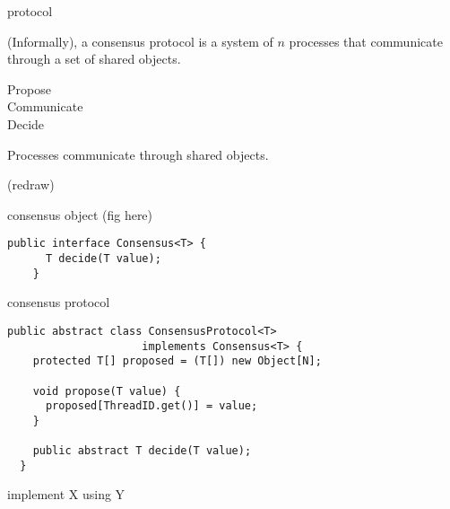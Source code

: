 \begin{frame}{}
  protocol
\end{frame}

\begin{frame}{}
  \begin{definition}
    (Informally), a consensus protocol is a system of $n$ processes
    that communicate through a set of shared objects.

    \begin{description}
      \item[Propose]
      \item[Communicate] 
      \item[Decide] 
    \end{description}
  \end{definition}
\end{frame}

\begin{frame}{}
  \centerline{Processes communicate through shared objects.}

  (redraw)
\end{frame}

\begin{frame}[fragile]{}
  consensus object (fig here)

  \begin{lstlisting}[style = JavaStyle]
    public interface Consensus<T> {
      T decide(T value);
    }
  \end{lstlisting}
\end{frame}

\begin{frame}[fragile]{}
  consensus protocol

  \begin{lstlisting}[style = JavaStyle]
  public abstract class ConsensusProtocol<T> 
                     implements Consensus<T> {
    protected T[] proposed = (T[]) new Object[N];
  
    void propose(T value) {
      proposed[ThreadID.get()] = value;
    }
  
    public abstract T decide(T value);
  }
  \end{lstlisting}
\end{frame}

\begin{frame}{}
  implement X using Y
\end{frame}
